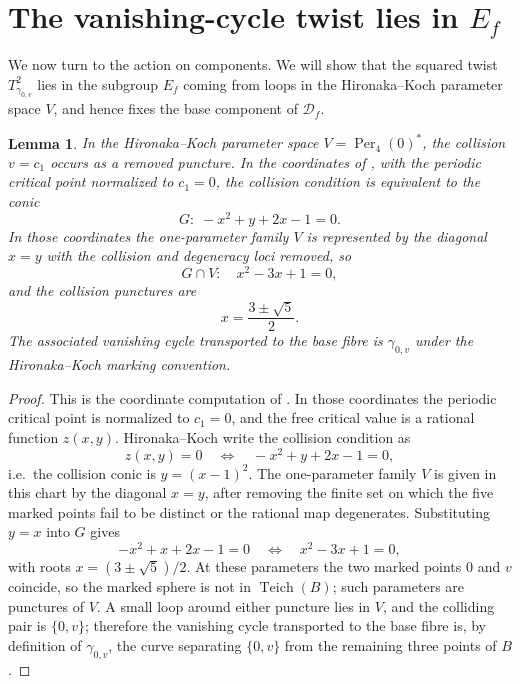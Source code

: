 \documentclass[12pt]{article}
\newtheorem{lemma}[theorem]{Lemma}
\theoremstyle{definition}
\theoremstyle{remark}
\numberwithin{equation}{section}
\newcommand{\Teich}{\operatorname{Teich}}
\newcommand{\Df}{\mathcal D_f}
\newcommand{\Ef}{E_f}
\newcommand{\Per}{\operatorname{Per}}
\begin{document}
\section{The vanishing-cycle twist lies in $\Ef$}
\label{sec:Ef}

We now turn to the action on components.  We will show that the
squared twist $T_{\gamma_{0,v}}^{2}$ lies in the subgroup $\Ef$ coming
from loops in the Hironaka--Koch parameter space $V$, and hence fixes
the base component of $\Df$.

\begin{lemma}
\label{lem:collision-in-V}
In the Hironaka--Koch parameter space $V=\Per_{4}(0)^{*}$, the collision
$v=c_{1}$ occurs as a removed puncture.  In the coordinates of
\cite[\S4.1]{HK}, with the periodic critical point normalized to
$c_{1}=0$, the collision condition is equivalent to the conic
\[
G:\;-x^{2}+y+2x-1=0.
\]
In those coordinates the one-parameter family $V$ is represented by the
diagonal $x=y$ with the collision and degeneracy loci removed, so
\[
G\cap V:\quad x^{2}-3x+1=0,
\]
and the collision punctures are
\[
x=\frac{3\pm\sqrt5}{2}.
\]
The associated vanishing cycle transported to the base fibre is
$\gamma_{0,v}$ under the Hironaka--Koch marking convention.
\end{lemma}
\begin{proof}
This is the coordinate computation of \cite[\S4.1]{HK}.  In those
coordinates the periodic critical point is normalized to $c_{1}=0$, and
the free critical value is a rational function $z(x,y)$.  Hironaka--Koch
write the collision condition as
\[
z(x,y)=0\quad\Longleftrightarrow\quad -x^{2}+y+2x-1=0,
\]
i.e.\ the collision conic is $y=(x-1)^{2}$.  The one-parameter family
$V$ is given in this chart by the diagonal $x=y$, after removing the
finite set on which the five marked points fail to be distinct or the
rational map degenerates.  Substituting $y=x$ into $G$ gives
\[
-x^{2}+x+2x-1=0\quad\Longleftrightarrow\quad x^{2}-3x+1=0,
\]
with roots $x=(3\pm\sqrt5)/2$.  At these parameters the two marked
points $0$ and $v$ coincide, so the marked sphere is not in
$\Teich(B)$; such parameters are punctures of $V$.  A small loop
around either puncture lies in $V$, and the colliding pair is
$\{0,v\}$; therefore the vanishing cycle transported to the base fibre
is, by definition of $\gamma_{0,v}$, the curve separating $\{0,v\}$
from the remaining three points of $B$.
\end{proof}
\end{document}
